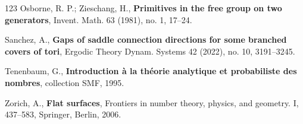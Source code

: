 \documentclass{article}
\theoremstyle{definition}
\begin{document}
\begin{thebibliography}{123}
	 {\sc Osborne, R. P.; Zieschang, H.}, {\bf Primitives in the free group on two generators},  Invent. Math. 63 (1981), no. 1, 17–24.

     {\sc Sanchez, A.}, {\bf Gaps of saddle connection directions for some branched covers of tori},  Ergodic Theory Dynam. Systems 42 (2022), no. 10, 3191–3245. 

     {\sc Tenenbaum, G.}, {\bf Introduction à la théorie analytique et probabiliste des nombres}, collection SMF, 1995.

  {\sc Zorich, A.}, {\bf Flat surfaces},  Frontiers in number theory, physics, and geometry. I, 437–583, Springer, Berlin, 2006. 
	
\end{thebibliography}
\end{document}
